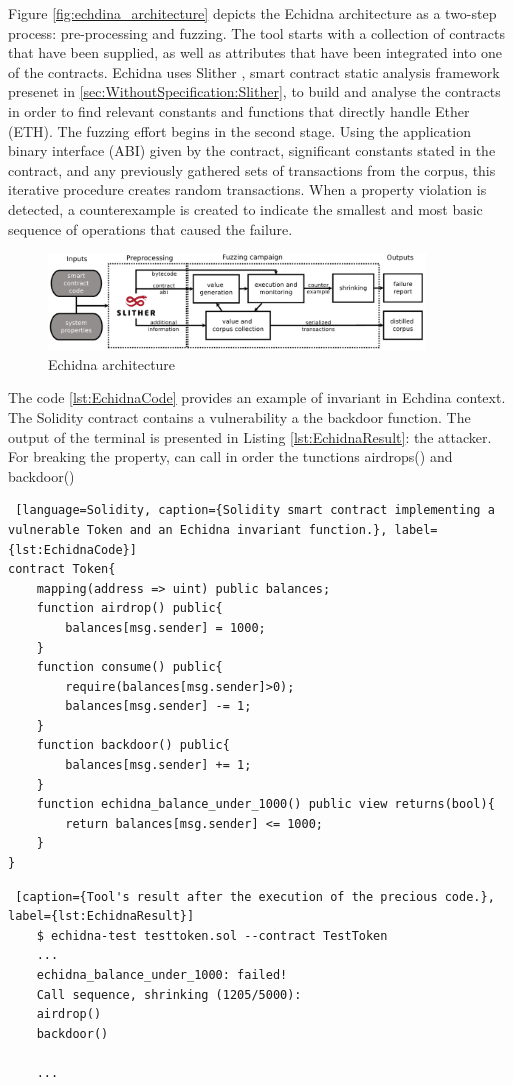 Figure \autoref{fig:echdina_architecture} depicts the Echidna architecture as a two-step process: pre-processing and fuzzing.
The tool starts with a collection of contracts that have been supplied, as well as attributes that have been integrated into one of the contracts.
Echidna uses Slither , smart contract static analysis framework presenet in \autoref{sec:WithoutSpecification:Slither}, to build and analyse the contracts in order to find relevant constants and functions that directly handle Ether (ETH).
The fuzzing effort begins in the second stage. 
Using the application binary interface (ABI) given by the contract, significant constants stated in the contract, 
and any previously gathered sets of transactions from the corpus, this iterative procedure creates random transactions. 
When a property violation is detected, a counterexample is created to indicate the smallest and most basic sequence of operations that caused the failure. 

\begin{figure}
    \centering
    \includegraphics[width=10cm]{logos/echidna.png}
    \caption{Echidna architecture}
    \label{fig:echdina_architecture}
\end{figure}

The code \autoref{lst:EchidnaCode} provides an example of invariant in Echdina context. The Solidity contract contains a vulnerability a the backdoor function. The output of the terminal is presented in Listing \autoref{lst:EchidnaResult}: the attacker. For breaking the property, can call in order the tunctions airdrops() and backdoor()

\begin{lstlisting} [language=Solidity, caption={Solidity smart contract implementing a vulnerable Token and an Echidna invariant function.}, label={lst:EchidnaCode}]
contract Token{
    mapping(address => uint) public balances;
    function airdrop() public{
        balances[msg.sender] = 1000;
    }
    function consume() public{
        require(balances[msg.sender]>0);
        balances[msg.sender] -= 1;
    }
    function backdoor() public{
        balances[msg.sender] += 1;
    }
    function echidna_balance_under_1000() public view returns(bool){
        return balances[msg.sender] <= 1000;
    }
}
\end{lstlisting}
\begin{lstlisting} [caption={Tool's result after the execution of the precious code.}, label={lst:EchidnaResult}]
    $ echidna-test testtoken.sol --contract TestToken
    ...
    echidna_balance_under_1000: failed!
    Call sequence, shrinking (1205/5000):
    airdrop()
    backdoor()

    ...
\end{lstlisting}

